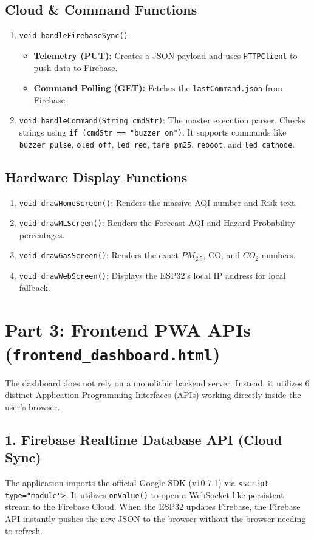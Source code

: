 \documentclass[11pt,a4paper]{article}
\begin{document}
\subsection{Cloud \& Command Functions}
\begin{enumerate}
    \item \texttt{void handleFirebaseSync()}: 
    \begin{itemize}
        \item \textbf{Telemetry (PUT):} Creates a JSON payload and uses \texttt{HTTPClient} to push data to Firebase.
        \item \textbf{Command Polling (GET):} Fetches the \texttt{lastCommand.json} from Firebase.
    \end{itemize}
    \item \texttt{void handleCommand(String cmdStr)}: The master execution parser. Checks strings using \texttt{if (cmdStr == "buzzer\_on")}. It supports commands like \texttt{buzzer\_pulse}, \texttt{oled\_off}, \texttt{led\_red}, \texttt{tare\_pm25}, \texttt{reboot}, and \texttt{led\_cathode}.
\end{enumerate}

\subsection{Hardware Display Functions}
\begin{enumerate}
    \item \texttt{void drawHomeScreen()}: Renders the massive AQI number and Risk text.
    \item \texttt{void drawMLScreen()}: Renders the Forecast AQI and Hazard Probability percentages.
    \item \texttt{void drawGasScreen()}: Renders the exact $PM_{2.5}$, CO, and $CO_2$ numbers.
    \item \texttt{void drawWebScreen()}: Displays the ESP32's local IP address for local fallback.
\end{enumerate}

\section{Part 3: Frontend PWA APIs (\texttt{frontend\_dashboard.html})}
The dashboard does not rely on a monolithic backend server. Instead, it utilizes 6 distinct Application Programming Interfaces (APIs) working directly inside the user's browser.

\subsection{1. Firebase Realtime Database API (Cloud Sync)}
The application imports the official Google SDK (v10.7.1) via \texttt{<script type="module">}. It utilizes \texttt{onValue()} to open a WebSocket-like persistent stream to the Firebase Cloud. When the ESP32 updates Firebase, the Firebase API instantly pushes the new JSON to the browser without the browser needing to refresh.
\end{document}
